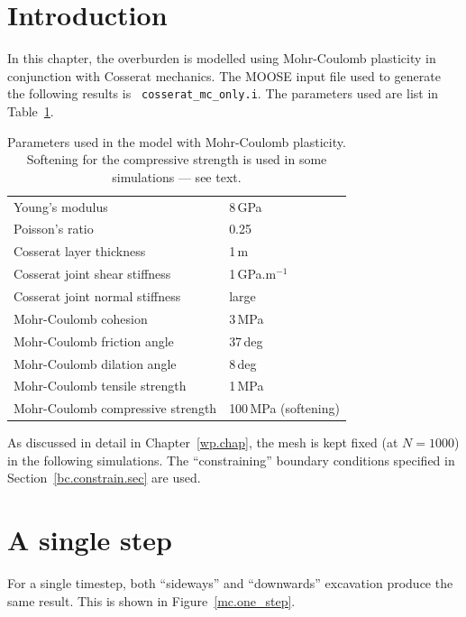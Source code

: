 \documentclass[]{scrreprt}
\begin{document}
\section{Introduction}
In this chapter, the overburden is modelled using Mohr-Coulomb
plasticity in conjunction with Cosserat mechanics.  The MOOSE input
file used to generate the following results is {\tt
  cosserat\_mc\_only.i}.  The parameters
used are list in Table~\ref{mc.params.tab}.

\begin{table}[htb]
\begin{center}
\begin{tabular}{ll}
Young's modulus & 8\,GPa \\
Poisson's ratio & 0.25 \\
Cosserat layer thickness & 1\,m \\
Cosserat joint shear stiffness & 1\,GPa.m$^{-1}$ \\
Cosserat joint normal stiffness & large \\
Mohr-Coulomb cohesion & 3\,MPa \\
Mohr-Coulomb friction angle & 37\,deg \\
Mohr-Coulomb dilation angle & 8\,deg \\
Mohr-Coulomb tensile strength & 1\,MPa \\
Mohr-Coulomb compressive strength & 100\,MPa (softening)
\end{tabular}
\caption{Parameters used in the model with Mohr-Coulomb plasticity.
  Softening for the compressive strength is used in some simulations
  --- see text.}
\label{mc.params.tab}
\end{center}
\end{table}

As discussed in detail in Chapter~\ref{wp.chap}, the mesh is kept
fixed (at $N=1000$) in the following simulations.   The
``constraining'' boundary conditions specified in
Section~\ref{bc.constrain.sec} are used.

\section{A single step}

For a single timestep, both ``sideways'' and ``downwards'' excavation
produce the same result.  This is shown in Figure~\ref{mc.one_step}.
\end{document}
